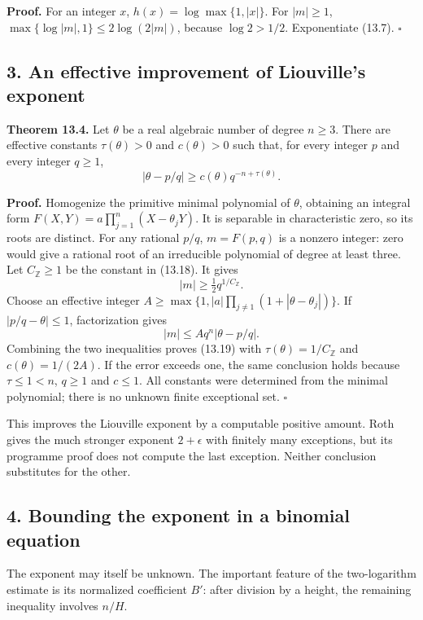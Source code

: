 \documentclass[
  11pt,
  a4paper,
]{article}
\begin{document}
\textbf{Proof.} For an integer \(x\), \(h(x)=\log\max\{1,|x|\}\). For
\(|m|\ge1\), \(\max\{\log|m|,1\}\le2\log(2|m|)\), because \(\log2>1/2\).
Exponentiate (13.7). \(\square\)

\subsection{3. An effective improvement of Liouville's
exponent}\label{an-effective-improvement-of-liouvilles-exponent}

\textbf{Theorem 13.4.} Let \(\theta\) be a real algebraic number of
degree \(n\ge3\). There are effective constants \(\tau(\theta)>0\) and
\(c(\theta)>0\) such that, for every integer \(p\) and every integer
\(q\ge1\), \[
|\theta-p/q|\ge c(\theta)q^{-n+\tau(\theta)}.
\tag{13.19}
\]

\textbf{Proof.} Homogenize the primitive minimal polynomial of
\(\theta\), obtaining an integral form
\(F(X,Y)=a\prod_{j=1}^n(X-\theta_jY)\). It is separable in
characteristic zero, so its roots are distinct. For any rational
\(p/q\), \(m=F(p,q)\) is a nonzero integer: zero would give a rational
root of an irreducible polynomial of degree at least three. Let
\(C_{\mathbb Z}\ge1\) be the constant in (13.18). It gives \[
|m|\ge\tfrac12 q^{1/C_{\mathbb Z}}.
\tag{13.20}
\] Choose an effective integer
\(A\ge\max\{1,|a|\prod_{j\ne1}(1+|\theta-\theta_j|)\}\). If
\(|p/q-\theta|\le1\), factorization gives \[
|m|\le A q^n|\theta-p/q|.
\tag{13.21}
\] Combining the two inequalities proves (13.19) with
\(\tau(\theta)=1/C_{\mathbb Z}\) and \(c(\theta)=1/(2A)\). If the error
exceeds one, the same conclusion holds because \(\tau\le1<n\), \(q\ge1\)
and \(c\le1\). All constants were determined from the minimal
polynomial; there is no unknown finite exceptional set. \(\square\)

This improves the Liouville exponent by a computable positive amount.
Roth gives the much stronger exponent \(2+\epsilon\) with finitely many
exceptions, but its programme proof does not compute the last exception.
Neither conclusion substitutes for the other.

\subsection{4. Bounding the exponent in a binomial
equation}\label{bounding-the-exponent-in-a-binomial-equation}

The exponent may itself be unknown. The important feature of the
two-logarithm estimate is its normalized coefficient \(B'\): after
division by a height, the remaining inequality involves \(n/H\).
\end{document}
